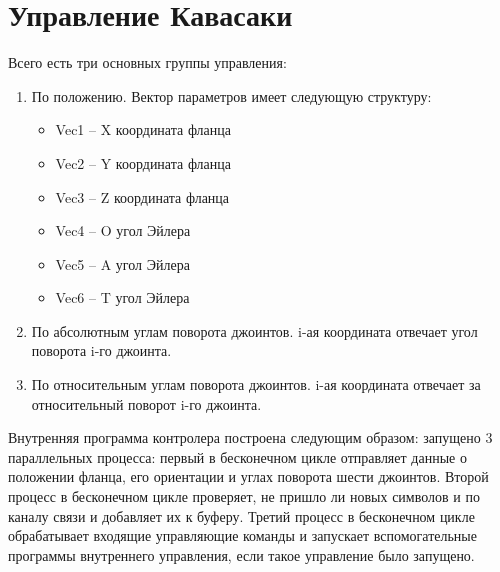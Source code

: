 \documentclass[a4paper,14pt,russian]{extreport} \usepackage{extsizes}
\begin{document}
		\section{Управление Кавасаки}
		Всего есть три основных группы управления:
		\begin{enumerate}  
			
			\item{По положению. Вектор параметров имеет следующую структуру: 
				\begin{itemize}
					\item{Vec1 – X координата фланца}
					\item{Vec2 – Y координата фланца}
					\item{ Vec3 – Z координата фланца}
					\item{Vec4 – O угол Эйлера}
					\item{Vec5 – A угол Эйлера} 
					\item{ Vec6 – T угол Эйлера}
				\end{itemize}
			}
			\item{По абсолютным углам поворота джоинтов. i-ая координата отвечает угол поворота  i-го джоинта.}
			\item{По относительным углам поворота джоинтов.  i-ая координата отвечает  за относительный поворот  i-го джоинта.}
		\end{enumerate}
		
		Внутренняя программа контролера построена следующим образом: запущено 3 параллельных процесса: первый в бесконечном цикле отправляет данные о положении фланца, его ориентации и углах поворота шести джоинтов. Второй процесс в бесконечном цикле проверяет, не пришло ли новых символов и по каналу связи и добавляет их к буферу. Третий  процесс в бесконечном цикле обрабатывает входящие управляющие команды и запускает вспомогательные программы внутреннего управления, если такое управление было запущено.
		
\end{document}
